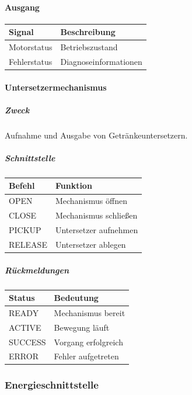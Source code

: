 \paragraph{Ausgang}\label{ausgang}

\begin{longtable}[]{@{}ll@{}}
\toprule\noalign{}
Signal & Beschreibung \\
\midrule\noalign{}
\endhead
\bottomrule\noalign{}
\endlastfoot
Motorstatus & Betriebszustand \\
Fehlerstatus & Diagnoseinformationen \\
\end{longtable}

\paragraph{Untersetzermechanismus}\label{untersetzermechanismus-1}

\subparagraph{Zweck}\label{zweck-4}

Aufnahme und Ausgabe von Getränkeuntersetzern.

\subparagraph{Schnittstelle}\label{schnittstelle-4}

\begin{longtable}[]{@{}ll@{}}
\toprule\noalign{}
Befehl & Funktion \\
\midrule\noalign{}
\endhead
\bottomrule\noalign{}
\endlastfoot
OPEN & Mechanismus öffnen \\
CLOSE & Mechanismus schließen \\
PICKUP & Untersetzer aufnehmen \\
RELEASE & Untersetzer ablegen \\
\end{longtable}

\subparagraph{Rückmeldungen}\label{ruxfcckmeldungen}

\begin{longtable}[]{@{}ll@{}}
\toprule\noalign{}
Status & Bedeutung \\
\midrule\noalign{}
\endhead
\bottomrule\noalign{}
\endlastfoot
READY & Mechanismus bereit \\
ACTIVE & Bewegung läuft \\
SUCCESS & Vorgang erfolgreich \\
ERROR & Fehler aufgetreten \\
\end{longtable}

\subsubsection{Energieschnittstelle}\label{energieschnittstelle}

